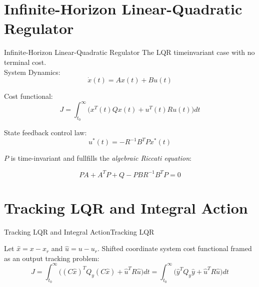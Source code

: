 \section{Infinite-Horizon Linear-Quadratic Regulator}
\begin{frame}{Infinite-Horizon Linear-Quadratic Regulator}
	The LQR timeinvariant case with no terminal cost.\\
	System Dynamics:
	\begin{equation}
		\dot{x}(t) = Ax(t) + Bu(t) \label{eq:TimeInvariantLinearSystem}
	\end{equation}

	Cost functional:		
	\begin{equation}\label{eq:LagrangeProblem}
		J = \int_{t_0}^{\infty} \big(x^T(t)Qx(t) + u^T(t)Ru(t)\big)dt
	\end{equation} 

	State feedback control law:
	\begin{equation}\label{eq:InfLQRFeedbackLaw}
		u^*(t) = -R^{-1}B^TPx^*(t)
	\end{equation}
	
	$P$ is time-invariant and fullfills the \textit{algebraic Riccati equation}:
	
	\begin{equation}\label{eq:ARE}
		PA + A^TP + Q - PBR^{-1}B^TP = 0
	\end{equation}
\end{frame}

\section{Tracking LQR and Integral Action}
\begin{frame}{Tracking LQR and Integral Action}{Tracking LQR}
	 
	
	Let $\hat{x} = x-x_r$ and $\hat{u} = u-u_r$. Shifted coordinate system cost functional framed as an output tracking problem:
	\begin{equation}\label{eq:LagrangeProblemOutput}
		J = \int_{t_0}^{\infty} \big((C\hat{x})^TQ_y(C\hat{x}) + \hat{u}^TR\hat{u}\big)dt = \int_{t_0}^{\infty} \big(\hat{y}^TQ_y\hat{y} + \hat{u}^TR\hat{u}\big)dt
	\end{equation} 
\end{frame}


